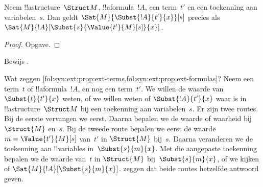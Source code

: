 \documentclass[openany]{memoir}
\begin{document}
\begin{prop} Neem !!a{structure}~$\Struct M$,
!!a{formula}~$!A$, een term~$t'$ en een toekenning aan variabelen~$s$.
Dan geldt $\Sat{M}{\Subst{!A}{t'}{x}}[s]$ precies als
$\Sat{M}{!A}[\Subst{s}{\Value{t'}{M}[s]}{x}]$.
\end{prop}

\begin{proof}
Opgave.
\end{proof}

\begin{prob}
Bewijs .
\end{prob}

\begin{explain}
  Wat zeggen
  \cref{fol:syn:ext:prop:ext-terms,fol:syn:ext:prop:ext-formulas}?
  Neem een term~$t$ of !!a{formula}~$!A$, en nog een term~$t'$.
  We willen de waarde van $\Subst{t}{t'}{x}$ weten, of we willen
  weten of $\Subst{!A}{t'}{x}$ waar is in !!a{structure}~$\Struct M$
  bij een toekenning aan variabelen~$s$. Er zijn twee routes. Bij de
  eerste vervangen we eerst. Daarna bepalen we de waarde of waarheid
  bij $\Struct{M}$ en~$s$. Bij de tweede route bepalen we eerst de
  waarde~$m = \Value{t'}{M}[s]$ van~$t'$ in
  $\Struct{M}$ bij~$s$. Daarna veranderen we de toekenning aan
  !!{variable}s in~$\Subst{s}{m}{x}$. Met die aangepaste toekenning
  bepalen we de waarde van~$t$ in $\Struct{M}$ bij~$\Subst{s}{m}{x}$,
  of we kijken of $\Sat{M}{!A}[\Subst{s}{m}{x}]$.
  zeggen dat beide routes hetzelfde antwoord geven.
\end{explain}
\endgroup

\begingroup
\def\olfilename{OLP-0166}
\def\olfilepath{content/first-order-logic/syntax-and-semantics/}
\hypertarget{unit-OLP-0166}{}



\end{document}
